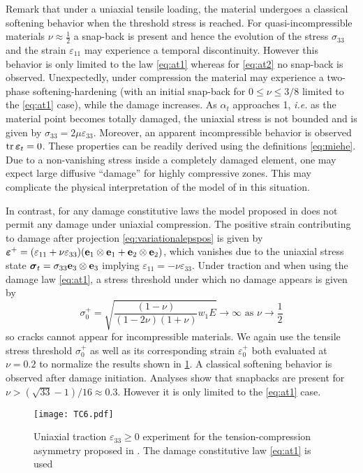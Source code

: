Remark that under a uniaxial tensile loading, the material undergoes a classical softening behavior when the threshold stress is reached. For quasi-incompressible materials $\nu\approx\frac{1}{2}$ a snap-back is present and hence the evolution of the stress $\sigma_{33}$ and the strain $\varepsilon_{11}$ may experience a temporal discontinuity. However this behavior is only limited to the law \eqref{eq:at1} whereas for \eqref{eq:at2} no snap-back is observed. Unexpectedly, under compression the material may experience a two-phase softening-hardening (with an initial snap-back for $0\leq \nu\leq 3/8$ limited to the \eqref{eq:at1} case), while the damage increases. As $\alpha_t$ approaches 1, \emph{i.e.} as the material point becomes totally damaged, the uniaxial stress is not bounded and is given by $\sigma_{33}=2\mu\varepsilon_{33}$. Moreover, an apparent incompressible behavior is observed $\tr\eps_t=0$. These properties can be readily derived using the definitions \eqref{eq:miehe}. Due to a non-vanishing stress inside a completely damaged element, one may expect large diffusive ``damage'' for highly compressive zones. This may complicate the physical interpretation of the model of \cite{MieheHofackerWelschinger:2010} in this situation.

In contrast, for any damage constitutive laws the model proposed in \cite{FreddiRoyer-Carfagni:2010} does not permit any damage under uniaxial compression. The positive strain contributing to damage after projection \eqref{eq:variationalepspos} is given by $\eps^+=(\varepsilon_{11}+\nu\varepsilon_{33})(\vec{e}_1\otimes\vec{e}_1+\vec{e}_2\otimes\vec{e}_2)$, which vanishes due to the uniaxial stress state $\sig_t=\sigma_{33}\vec{e}_3\otimes\vec{e}_3$ implying $\varepsilon_{11}=-\nu\varepsilon_{33}$. Under traction and when using the damage law \eqref{eq:at1}, a stress threshold under which no damage appears is given by
\[
\sigma_0^+=\sqrt{\frac{(1-\nu)}{(1-2\nu)(1+\nu)}w_1E}\to\infty\text{ as $\nu\to\frac{1}{2}$}
\]
so cracks cannot appear for incompressible materials. We again use the tensile stress threshold $\sigma_0^+$ as well as its corresponding strain $\varepsilon_0^+$ both evaluated at $\nu=0.2$ to normalize the results shown in \cref{fig:freddi}. A classical softening behavior is observed after damage initiation. Analyses show that snapbacks are present for $\nu>(\sqrt{33}-1)/16\approx 0.3$. However it is only limited to the \eqref{eq:at1} case.
\begin{figure}[htbp]
\centering
\texttt{[image: TC6.pdf]}
\caption{Uniaxial traction $\varepsilon_{33}\geq 0$ experiment for the tension-compression asymmetry proposed in \cite{FreddiRoyer-Carfagni:2010}. The damage constitutive law \eqref{eq:at1} is used} \label{fig:freddi}
\end{figure}

